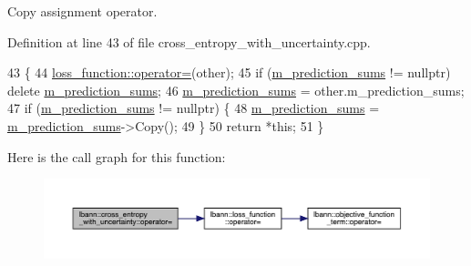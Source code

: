 Copy assignment operator. 

Definition at line 43 of file cross\+\_\+entropy\+\_\+with\+\_\+uncertainty.\+cpp.


\begin{DoxyCode}
43                                                                                                            
                \{
44   \hyperlink{classlbann_1_1loss__function_ab882c642619ea4285b61e735d84e401c}{loss\_function::operator=}(other);
45   \textcolor{keywordflow}{if} (\hyperlink{classlbann_1_1cross__entropy__with__uncertainty_a4b45767c526e7ebe4a55ff1a1ddbd7ba}{m\_prediction\_sums} != \textcolor{keyword}{nullptr}) \textcolor{keyword}{delete} \hyperlink{classlbann_1_1cross__entropy__with__uncertainty_a4b45767c526e7ebe4a55ff1a1ddbd7ba}{m\_prediction\_sums};
46   \hyperlink{classlbann_1_1cross__entropy__with__uncertainty_a4b45767c526e7ebe4a55ff1a1ddbd7ba}{m\_prediction\_sums} = other.m\_prediction\_sums;
47   \textcolor{keywordflow}{if} (\hyperlink{classlbann_1_1cross__entropy__with__uncertainty_a4b45767c526e7ebe4a55ff1a1ddbd7ba}{m\_prediction\_sums} != \textcolor{keyword}{nullptr}) \{
48     \hyperlink{classlbann_1_1cross__entropy__with__uncertainty_a4b45767c526e7ebe4a55ff1a1ddbd7ba}{m\_prediction\_sums} = \hyperlink{classlbann_1_1cross__entropy__with__uncertainty_a4b45767c526e7ebe4a55ff1a1ddbd7ba}{m\_prediction\_sums}->Copy();
49   \}
50   \textcolor{keywordflow}{return} *\textcolor{keyword}{this};
51 \}
\end{DoxyCode}
Here is the call graph for this function\+:\nopagebreak
\begin{figure}[H]
\begin{center}
\leavevmode
\includegraphics[width=350pt]{classlbann_1_1cross__entropy__with__uncertainty_a036433c9c57e030d1923543dc211813a_cgraph}
\end{center}
\end{figure}
\mbox{\label{classlbann_1_1cross__entropy__with__uncertainty_a44a47468f1d04734068d085417eeab93}} 
